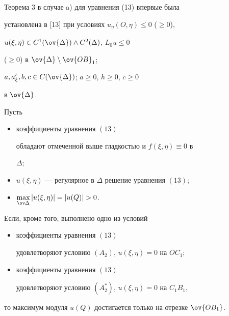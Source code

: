 \begin{note}


Теорема 3 в случае a) для уравнения (13) впервые была 


установлена в [13] при условиях $u_{\eta}(O,\eta)\le 0$ ($\ge 0$),


$u(\xi,\eta)\in C^1(\ov {\Delta })\land C^2(\Delta)$, $L_0u\le 0$


($\ge 0$) в $\ov {\Delta} \setminus \ov {OB}_1$;


$a,a_{\xi}',b,c\in C(\ov{\Delta })$; $a\ge 0$, $h\ge 0$, $c\ge 0$


в $\ov {\Delta }$.


\end{note}





\begin{thm}


Пусть


\begin{itemize}


\item[1)] коэффициенты уравнения $(13)$


обладают отмеченной выше гладкостью и $f(\xi,\eta)\equiv 0$ в 


$\Delta;$ 


\item[2)] $u(\xi,\eta)$ --- регулярное в $\Delta$ решение уравнения $(13);$


\item[3)] $\max \limits_{\ov \Delta} |u(\xi,\eta)|=|u(Q)|>0$.


\end{itemize}


Если, кроме того, выполнено одно из условий


\begin{itemize}


\begin{itemize}


\item[a)] коэффициенты уравнения $(13)$


удовлетворяют условию $(A_2)$, $u(\xi,\eta)=0$ на $OC_1;$


\item[б)] коэффициенты уравнения $(13)$


удовлетворяют условию $(A_2^*)$, $u(\xi,\eta)=0$ на $C_1B_1$,


\end{itemize}


\end{itemize}


то максимум модуля $u(Q)$ достигается только на отрезке $\ov {OB_1}$.


\end{thm}





